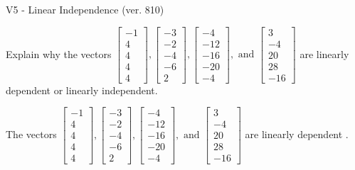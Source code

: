 \begin{exercise}
  \begin{exerciseTitle}V5 - Linear Independence (ver. 810)\end{exerciseTitle}
  \begin{exerciseStatement}
    Explain why the vectors \(\left[\begin{array}{r}
-1 \\
4 \\
4 \\
4 \\
4
\end{array}\right] , \left[\begin{array}{r}
-3 \\
-2 \\
-4 \\
-6 \\
2
\end{array}\right] , \left[\begin{array}{r}
-4 \\
-12 \\
-16 \\
-20 \\
-4
\end{array}\right] , \text{ and } \left[\begin{array}{r}
3 \\
-4 \\
20 \\
28 \\
-16
\end{array}\right]\) are linearly dependent or linearly independent.	


  \end{exerciseStatement}
  \begin{exerciseAnswer}
   The vectors \(\left[\begin{array}{r}
-1 \\
4 \\
4 \\
4 \\
4
\end{array}\right] , \left[\begin{array}{r}
-3 \\
-2 \\
-4 \\
-6 \\
2
\end{array}\right] , \left[\begin{array}{r}
-4 \\
-12 \\
-16 \\
-20 \\
-4
\end{array}\right] , \text{ and } \left[\begin{array}{r}
3 \\
-4 \\
20 \\
28 \\
-16
\end{array}\right]\) are 
  	 linearly dependent  .
  


  \end{exerciseAnswer}
\end{exercise}